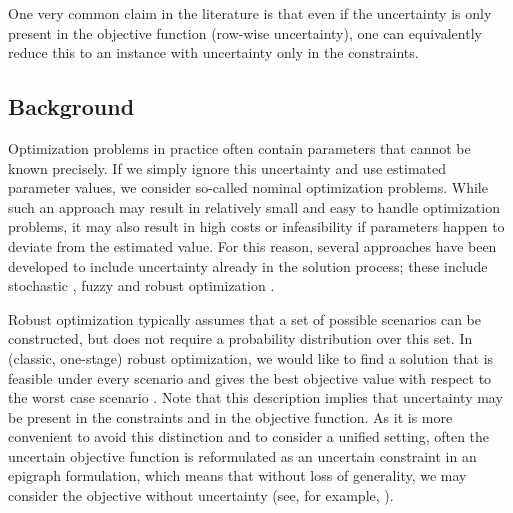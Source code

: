 One very common claim in the literature is that even if the uncertainty 
is only present in the objective function (row-wise uncertainty), one can equivalently reduce this to an instance with uncertainty only in the constraints.



\subsection{Background}

Optimization problems in practice often contain parameters that cannot be known precisely. If we simply ignore this uncertainty and use estimated parameter values, we consider so-called nominal optimization problems. While such an approach may result in relatively small and easy to handle optimization problems, it may also result in high costs or infeasibility if parameters happen to deviate from the estimated value. For this reason, several approaches have been developed to include uncertainty already in the solution process; these include stochastic \cite{powell2019unified}, fuzzy \cite{lodwick2010fuzzy} and robust optimization \cite{ben2009robust}.

Robust optimization typically assumes that a set of possible scenarios can be constructed, but does not require a probability distribution over this set. In (classic, one-stage) robust optimization, we would like to find a solution that is feasible under every scenario and gives the best objective value with respect to the worst case scenario  \cite{ben2002robust}. Note that this description implies that uncertainty may be present in the constraints and in the objective function. As it is more convenient to avoid this distinction and to consider a unified setting, often the uncertain objective function is reformulated as an uncertain constraint in an epigraph formulation, which means that without loss of generality, we may consider the objective without uncertainty (see, for example, \cite{ben2002robust}).

